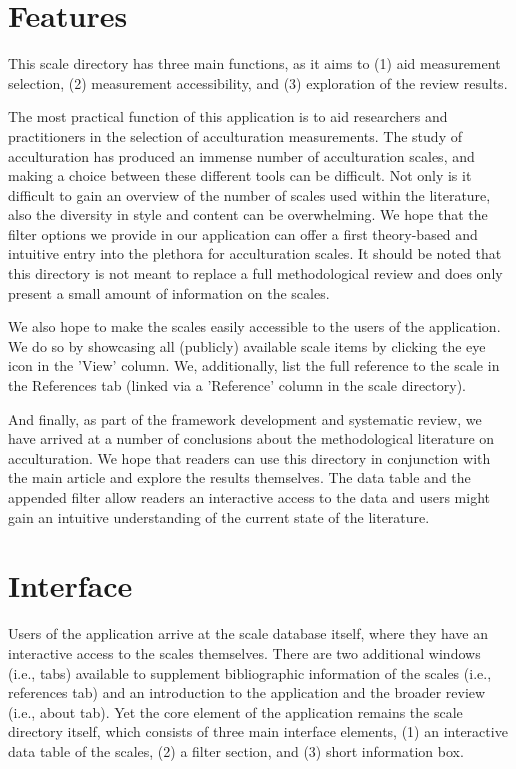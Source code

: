 \documentclass[man, 12pt, a4paper]{apa7}
\begin{document}
\section{Features}
This scale directory has three main functions, as it aims to (1) aid measurement selection, (2) measurement accessibility, and (3) exploration of the review results.

The most practical function of this application is to aid researchers and practitioners in the selection of acculturation measurements. The study of acculturation has produced an immense number of acculturation scales, and making a choice between these different tools can be difficult. Not only is it difficult to gain an overview of the number of scales used within the literature, also the diversity in style and content can be overwhelming. We hope that the filter options we provide in our application can offer a first theory-based and intuitive entry into the plethora for acculturation scales. It should be noted that this directory is not meant to replace a full methodological review and does only present a small amount of information on the scales.

We also hope to make the scales easily accessible to the users of the application. We do so by showcasing all (publicly) available scale items by clicking the eye icon in the 'View' column. We, additionally, list the full reference to the scale in the References tab (linked via a 'Reference' column in the scale directory). 

And finally, as part of the framework development and systematic review, we have arrived at a number of conclusions about the methodological literature on acculturation. We hope that readers can use this directory in conjunction with the main article and explore the results themselves. The data table and the appended filter allow readers an interactive access to the data and users might gain an intuitive understanding of the current state of the literature.


\section{Interface}
Users of the application arrive at the scale database itself, where they have an interactive access to the scales themselves. There are two additional windows (i.e., tabs) available to supplement bibliographic information of the scales (i.e., references tab) and an introduction to the application and the broader review (i.e., about tab). Yet the core element of the application remains the scale directory itself, which consists of three main interface elements, (1) an interactive data table of the scales, (2) a filter section, and (3) short information box.
\end{document}
